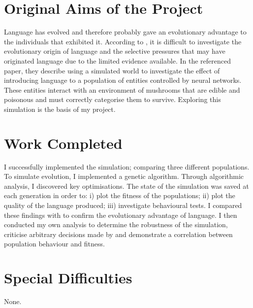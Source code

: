 \documentclass[12pt,a4paper]{report}
\begin{document}
\section*{Original Aims of the Project}

Language has evolved and therefore probably gave an evolutionary advantage to the individuals that exhibited it. According to \citet{Cangelosi1998}, it is difficult to investigate the evolutionary origin of language and the selective pressures that may have originated language due to the limited evidence available. In the referenced paper, they describe using a simulated world to investigate the effect of introducing language to a population of entities controlled by neural networks. These entities interact with an environment of mushrooms that are edible and poisonous and must correctly categorise them to survive. Exploring this simulation is the basis of my project.

\section*{Work Completed}

I successfully implemented the simulation; comparing three different populations. To simulate evolution, I implemented a genetic algorithm. Through algorithmic analysis, I discovered key optimisations. The state of the simulation was saved at each generation in order to: i) plot the fitness of the populations; ii) plot the quality of the language produced; iii) investigate behavioural tests. I compared these findings with \citet{Cangelosi1998} to confirm the evolutionary advantage of language. I then conducted my own analysis to determine the robustness of the simulation, criticise arbitrary decisions made by \citet{Cangelosi1998} and demonstrate a correlation between population behaviour and fitness.

\section*{Special Difficulties}

None.
 
\tableofcontents

\listoffigures

\end{document}
